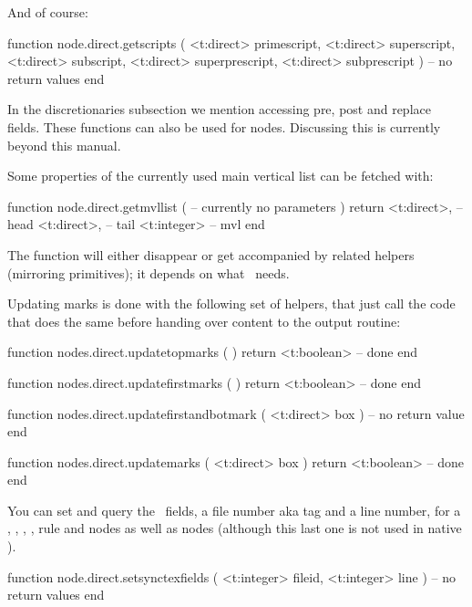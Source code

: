 And of course:

\starttyping[option=LUA]
function node.direct.getscripts (
    <t:direct> primescript,
    <t:direct> superscript,
    <t:direct> subscript,
    <t:direct> superprescript,
    <t:direct> subprescript
)
    -- no return values
end
\stoptyping

In the discretionaries subsection we mention accessing pre, post and replace
fields. These functions can also be used for  nodes. Discussing
this is currently beyond this manual.

\stopsubsection

\startsubsection[title={MVL}]

Some properties of the currently used main vertical list can be fetched with:

\starttyping[option=LUA]
function node.direct.getmvllist (
    -- currently no parameters
)
    return
        <t:direct>,  -- head
        <t:direct>,  -- tail
        <t:integer> -- mvl
end
\stoptyping

\stopsubsection

\startsubsection[title={Balancing}]

The  function will either disappear or get accompanied
by related helpers (mirroring primitives); it depends on what \CONTEXT\ needs.

Updating marks is done with the following set of helpers, that just call the code
that does the same before handing over content to the output routine:

\starttyping[option=LUA]
function nodes.direct.updatetopmarks ( )
    return <t:boolean> -- done
end

function nodes.direct.updatefirstmarks ( )
    return <t:boolean> -- done
end

function nodes.direct.updatefirstandbotmark ( <t:direct> box )
    -- no return value
end

function nodes.direct.updatemarks ( <t:direct> box )
    return <t:boolean> -- done
end
\stoptyping

\stopsubsection

\startsubsection[title={\SYNCTEX}]

You can set and query the \SYNCTEX\ fields, a file number aka tag and a line
number, for a , , , , \type
{rule} and  nodes as well as  nodes (although this last
one is not used in native \SYNCTEX).

\starttyping[option=LUA]
function node.direct.setsynctexfields ( <t:integer> fileid, <t:integer> line )
    -- no return values
end

